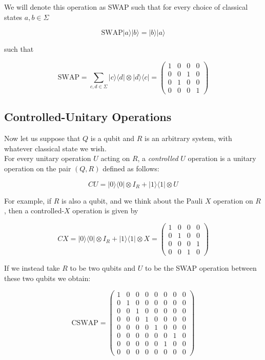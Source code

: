 \documentclass[svgnames]{article}     %
\begin{document}
We will denote this operation as SWAP such that for every choice of classical states $a, b \in \Sigma$

\[
\text{SWAP} |a\rangle |b\rangle = |b\rangle |a\rangle 
\] \vspace{5px}

such that 

\[
\text{SWAP}  = \sum_{c,d\in\Sigma} |c\rangle \langle d | \otimes |d\rangle \langle c | = \begin{pmatrix}
  1 & 0 & 0 & 0 \\ 0 & 0 & 1 & 0 \\ 0 & 1 & 0 & 0 \\ 0 & 0 & 0 & 1
\end{pmatrix} 
\] \vspace{5px}

\subsection{Controlled-Unitary Operations}

Now let us suppose that $Q$ is a qubit and $R$ is an arbitrary system, with whatever classical state we wish. \\

For every unitary operation $U$ acting on $R$, a \textit{controlled} $U$ operation is a unitary operation on the pair $(Q, R)$ defined as follows: 

\[
CU = |0\rangle \langle 0 | \otimes I_R + |1\rangle \langle 1 | \otimes U  
\] \vspace{5px}

For example, if $R$ is also a qubit, and we think about the Pauli $X$ operation on $R$, then a controlled-$X$ operation is given by 

\[
CX = |0\rangle \langle 0 | \otimes I_R + |1\rangle \langle 1 |  \otimes X = \begin{pmatrix}
  1 & 0 & 0 & 0 \\ 0 & 1 & 0 & 0 \\ 0 & 0 & 0 & 1 \\ 0 & 0 & 1 & 0 
\end{pmatrix} 
\] \vspace{5px}

If we instead take $R$ to be two qubits and $U$ to be the SWAP operation between these two qubits we obtain: 

\[
\text{CSWAP}  = \begin{pmatrix}
  1 & 0 & 0 & 0 & 0 & 0 & 0 & 0 \\
  0 & 1 & 0 & 0 & 0 & 0 & 0 & 0 \\
  0 & 0 & 1 & 0 & 0 & 0 & 0 & 0 \\
  0 & 0 & 0 & 1 & 0 & 0 & 0 & 0 \\
  0 & 0 & 0 & 0 & 1 & 0 & 0 & 0 \\
  0 & 0 & 0 & 0 & 0 & 0 & 1 & 0 \\
  0 & 0 & 0 & 0 & 0 & 1 & 0 & 0 \\
  0 & 0 & 0 & 0 & 0 & 0 & 0 & 0
\end{pmatrix} 
\] \vspace{5px}
\end{document}
